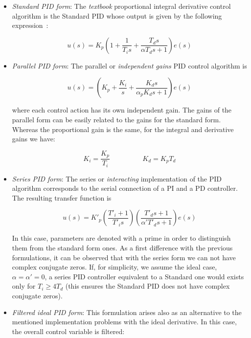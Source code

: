 \begin{itemize}
\item \emph{Standard PID form}: The \emph{textbook} proportional integral derivative control algorithm is the Standard PID whose output is given by the following expression~\cite{astromhagglund1995}:

\begin{equation}
    u(s)= K_p \left( 1 + \frac{1}{T_i s} + \frac{T_d s}{\alpha T_d s+1} \right ) e(s)
\end{equation}

\item \emph{Parallel PID form}: The parallel or \emph{independent gains} PID control algorithm is

\begin{equation}
	u(s) =  \left( K_p + \frac{K_i}{s}+ \frac{K_d s}{\alpha_p K_d s+1}\right) e(s)
\end{equation}

\noindent where each control action has its own independent gain. The gains of the parallel form can be easily related to the gains for the standard form. Whereas the proportional gain is the same, for the integral and derivative gains we have:

\begin{equation}
K_i=\frac{K_p}{T_i} \hspace{2cm}  K_d=K_pT_d 
\end{equation} 

\item \emph{Series PID form}: The  series or \emph{interacting} implementation of the PID algorithm corresponds to the serial connection of a PI and a PD controller. The resulting transfer function is

\begin{equation}
	u(s) = K'_p \left( \frac{T'_i+1}{T'_i s}\right) \left(\frac{T'_d s + 1}{\alpha' T'_d s +1}\right)e(s)
\end{equation}

In this case, parameters are denoted with a prime in order to distinguish them from the standard form ones. As a first difference with the previous formulations, it can be observed that with the series form we can not have complex conjugate zeros. If, for simplicity, we assume the ideal case, $\alpha=\alpha'=0$, a series PID controller equivalent to a Standard one would exists only for $T_i \ge 4 T_d$ (this ensures the Standard PID does not have complex conjugate zeros).

\item \emph{Filtered ideal PID form}: This formulation arises also as an alternative to the mentioned implementation problems with the ideal derivative. In this case, the overall control variable is filtered:


\end{itemize}
